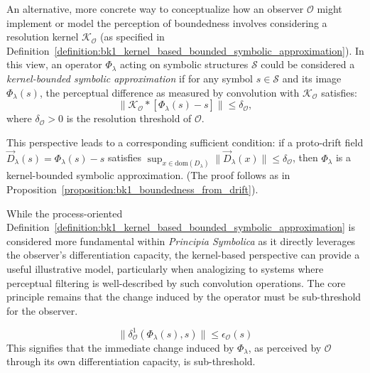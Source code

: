\begin{remark}
\label{remark:bk1_kernel_based_bounded_approximation}
An alternative, more concrete way to conceptualize how an observer $\mathcal{O}$ might implement or model the perception of boundedness involves considering a resolution kernel $\mathcal{K}_\mathcal{O}$ (as specified in Definition~\ref{definition:bk1_kernel_based_bounded_symbolic_approximation}).  
In this view, an operator $\Phi_\lambda$ acting on symbolic structures $\mathcal{S}$ could be considered a \emph{kernel-bounded symbolic approximation} if for any symbol $s \in \mathcal{S}$ and its image $\Phi_\lambda(s)$, the perceptual difference as measured by convolution with $\mathcal{K}_\mathcal{O}$ satisfies:
\[
\|\mathcal{K}_\mathcal{O} \ast [\Phi_\lambda(s) - s]\| \leq \delta_\mathcal{O},
\]
where $\delta_\mathcal{O} > 0$ is the resolution threshold of $\mathcal{O}$.

This perspective leads to a corresponding sufficient condition: if a proto-drift field $\vec{D}_\lambda(s) = \Phi_\lambda(s) - s$ satisfies $\sup_{x \in \mathrm{dom}(D_\lambda)} \|\vec{D}_\lambda(x)\| \leq \delta_\mathcal{O}$, then $\Phi_\lambda$ is a kernel-bounded symbolic approximation. (The proof follows as in Proposition~\ref{proposition:bk1_boundedness_from_drift}).

While the process-oriented Definition~\ref{definition:bk1_kernel_based_bounded_symbolic_approximation} is considered more fundamental within \textit{Principia Symbolica} as it directly leverages the observer's differentiation capacity, the kernel-based perspective can provide a useful illustrative model, particularly when analogizing to systems where perceptual filtering is well-described by such convolution operations. The core principle remains that the change induced by the operator must be sub-threshold for the observer.
\end{remark}

\begin{equation}
    \|\delta^1_{\mathcal{O}}(\Phi_\lambda(s), s)\| \leq \epsilon_{\mathcal{O}}(s)
\end{equation}
This signifies that the immediate change induced by $\Phi_\lambda$, as perceived by $\mathcal{O}$ through its own differentiation capacity, is sub-threshold.

